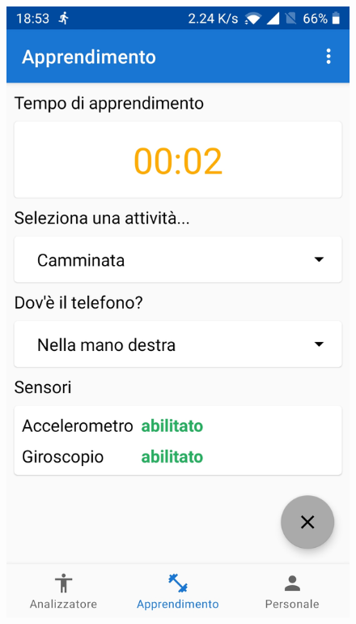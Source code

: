 \begin{figure}[H]
    \includegraphics[scale = 0.10]{assets/images/screenshots/2b_Preparation.jpg}

\end{figure}

